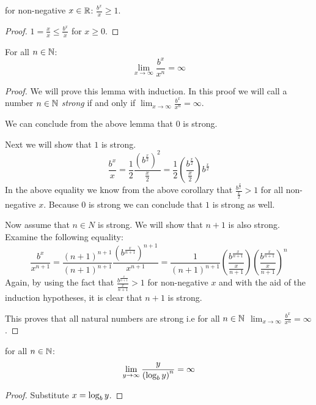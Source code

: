 \begin{corollary}
	for non-negative $x \in \mathbb{R}$: $\frac{b^{x}}{x} \ge 1$.
\end{corollary}

\begin{proof}
	$1 = \frac{x}{x} \le \frac{b^{x}}{x}$ for $x \ge 0$.
\end{proof}

\begin{proposition}
	For all $n \in \mathbb{N}$: 
	\[
		\lim_{x \rightarrow \infty} \frac{b^{x}}{x^{n}} = \infty
	\]
\end{proposition}

\begin{proof}
	We will prove this lemma with induction. In this proof we will call a number
	$n \in \mathbb{N}$ \emph{strong} if and only if
	$\lim_{x \rightarrow \infty} \frac{b^{x}}{x^{n}} = \infty$.
	
	We can conclude from the above lemma that $0$ is strong.
	
	Next we will show that $1$ is strong.
	\[
		\frac{b^{x}}{x} =%
		\frac{1}{2}\frac{\left(b^{\frac{x}{2}}\right)^2}{\frac{x}{2}} =%
		\frac{1}{2}\left(\frac{b^{\frac{x}{2}}}{\frac{x}{2}}\right)b^{\frac{x}{2}}
	\]
	In the above equality we know from the above corollary that 
	$\frac{b^{\frac{x}{2}}}{\frac{x}{2}} > 1$ for all non-negative $x$.
	Because $0$ is strong we can conclude that $1$ is strong as well.
	
	Now assume that $n \in N$ is strong. We will show that $n+1$ is also strong.
	Examine the following equality:
	\[
		\frac{b^{x}}{x^{n+1}} =%
		\frac{(n+1)^{n+1}}{(n+1)^{n+1}}%
		\frac{\left(b^{\frac{x}{n+1}}\right)^{n+1}}{x^{n+1}} =%
		\frac{1}{(n+1)^{n+1}}%
		\left(\frac{b^{\frac{x}{n+1}}}{\frac{x}{n+1}}\right)%
		\left(\frac{b^{\frac{x}{n+1}}}{\frac{x}{n+1}}\right)^{n}%
	\]
	Again, by using the fact that $\frac{b^{\frac{x}{n+1}}}{\frac{x}{n+1}} > 1$
	for non-negative $x$ and with the aid of the induction hypotheses, it is 
	clear that $n+1$ is strong.
	
	This proves that all natural numbers are strong i.e for all $n \in \mathbb{N}$
	$\lim_{x \rightarrow \infty} \frac{b^{x}}{x^{n}} = \infty$.
\end{proof}

\begin{corollary}
	for all $n \in \mathbb{N}$:
	\[
		\lim_{y \rightarrow \infty} \frac{{y}}{\left(\log_{b}{y}\right)^{n}} = \infty
	\]
\end{corollary}

\begin{proof}
	Substitute $x = \log_{b}{y}$.
\end{proof}

